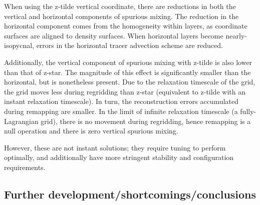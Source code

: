 When using the z-tilde vertical coordinate, there are reductions in both the vertical and horizontal components of spurious mixing. The reduction in the horizontal component comes from the homogeneity within layers, as coordinate surfaces are aligned to density surfaces. When horizontal layers become nearly-isopycnal, errors in the horizontal tracer advection scheme are reduced. %

Additionally, the vertical component of spurious mixing with z-tilde is also lower than that of z-star. The magnitude of this effect is significantly smaller than the horizontal, but is nonetheless present. Due to the relaxation timescale of the grid, the grid moves less during regridding than z-star (equivalent to z-tilde with an instant relaxation timescale). In turn, the reconstruction errors accumulated during remapping are smaller. In the limit of infinite relaxation timescale (a fully-Lagrangian grid), there is no movement during regridding, hence remapping is a null operation and there is zero vertical spurious mixing.


However, these are not instant solutions; they require tuning to perform optimally, and additionally have more stringent stability and configuration requirements.

\subsection{Further development/shortcomings/conclusions}
